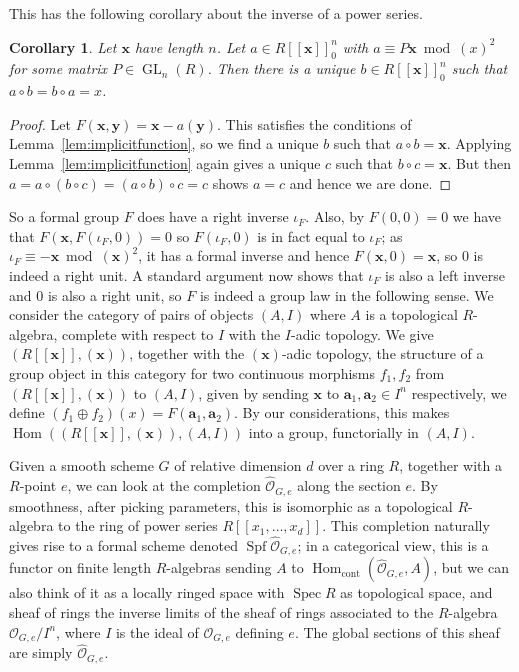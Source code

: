 \documentclass[12pt]{article}
\newcommand{\va}{\mathbf{a}}
\newcommand{\vx}{\mathbf{x}}
\newcommand{\vy}{\mathbf{y}}
\renewcommand{\O}{\mathcal{O}}
\DeclareMathOperator{\Hom}{Hom}
\DeclareMathOperator{\Spec}{Spec}
\DeclareMathOperator{\Spf}{Spf}
\DeclareMathOperator{\GL}{GL}
\theoremstyle{plain}
\newtheorem{cor}[thm]{Corollary} %
\theoremstyle{definition}
\theoremstyle{remark}
\begin{document}
This has the following corollary about the inverse of a power series.
\begin{cor}
\label{lem:formalinverse}
Let $\vx$ have length $n$. Let $a \in R[[\vx]]_0^n$ with $a \equiv P\vx \bmod (x)^2$ for some matrix $P\in \GL_n(R)$. Then there is a unique $b \in R[[\vx]]_0^n$ such that $a \circ b = b \circ a = x$.
\end{cor}
\begin{proof}
Let $F(\vx,\vy) = \vx - a(\vy)$. This satisfies the conditions of Lemma~\ref{lem:implicitfunction}, so we find a unique $b$ such that $a \circ b = \vx$. Applying Lemma~\ref{lem:implicitfunction} again gives a unique $c$ such that $b \circ c = \vx$. But then $a = a \circ (b \circ c) = (a \circ b) \circ c = c$ shows $a = c$ and hence we are done.
\end{proof}
So a formal group $F$ does have a right inverse $\iota_F$. Also, by $F(0,0) = 0$ we have that $F(\vx,F(\iota_F,0)) = 0$ so $F(\iota_F,0)$ is in fact equal to $\iota_F$; as $\iota_F \equiv -\vx \bmod (\vx)^2$, it has a formal inverse and hence $F(\vx,0) = \vx$, so $0$ is indeed a right unit. A standard argument now shows that $\iota_F$ is also a left inverse and $0$ is also a right unit, so $F$ is indeed a group law in the following sense. We consider the category of pairs of objects $(A,I)$ where $A$ is a topological $R$-algebra, complete with respect to $I$ with the $I$-adic topology. We give $(R[[\vx]],(\vx))$, together with the $(\vx)$-adic topology, the structure of a group object in this category for two continuous morphisms $f_1,f_2$ from $(R[[\vx]],(\vx))$ to $(A,I)$, given by sending $\vx$ to $\va_1,\va_2 \in I^n$ respectively, we define $(f_1 \oplus f_2)(x) = F(\va_1,\va_2)$. By our considerations, this makes $\Hom((R[[\vx]],(\vx)),(A,I))$ into a group, functorially in $(A,I)$.

Given a smooth scheme $G$ of relative dimension $d$ over a ring $R$, together with a $R$-point $e$, we can look at the completion $\widehat{\O}_{G,e}$ along the section $e$. By smoothness, after picking parameters, this is isomorphic as a topological $R$-algebra to the ring of power series $R[[x_1,\dots,x_d]]$. This completion naturally gives rise to a formal scheme denoted $\Spf \widehat{\O}_{G,e}$; in a categorical view, this is a functor on finite length $R$-algebras sending $A$ to $\Hom_{\text{cont}}(\widehat{\O}_{G,e},A)$, but we can also think of it as a locally ringed space with $\Spec R$ as topological space, and sheaf of rings the inverse limits of the sheaf of rings associated to the $R$-algebra $\O_{G,e}/I^n$, where $I$ is the ideal of $\O_{G,e}$ defining $e$. The global sections of this sheaf are simply $\widehat{\O}_{G,e}$. 
\end{document}
